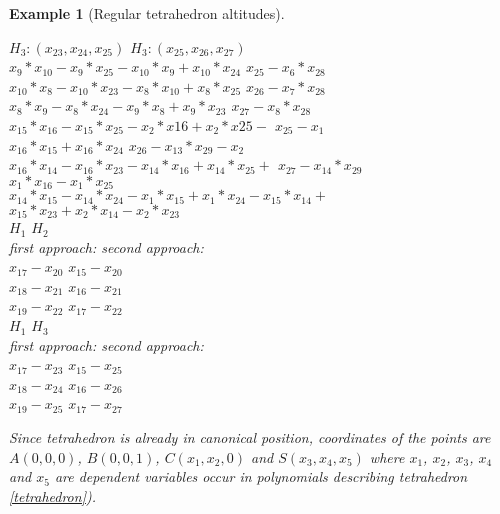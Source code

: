 \documentclass[final,1p,times,authoryear]{elsarticle}
\newtheorem{example}[theorem]{Example}
\begin{document}
\begin{example}[Regular tetrahedron altitudes]
\begin{footnotesize}
\begin{tabbing}
\>\> $H_3 : (x_{23}, x_{24}, x_{25})$  \>\>  $H_3 : (x_{25}, x_{26}, x_{27})$ \\
\>\> $x_9*x_{10}  -  x_9*x_{25}  -  x_{10}*x_9  +  x_{10}*x_{24}$  \>\> $x_{25}  -  x_6*x_{28}$ \\
\>\> $x_{10}*x_8  -  x_{10}*x_{23}  -  x_8*x_{10}  +  x_8*x_{25}$ \>\>  $x_{26}  -  x_7*x_{28}$ \\
\>\> $x_8*x_9  -  x_8*x_{24}  -  x_9*x_8  +  x_9*x_{23}$ \>\>  $x_{27}  -  x_8*x_{28}$ \\
\>\> $x_{15}*x_{16}  -  x_{15}*x_{25}  -  x_2*x{16}  +  x_2*x{25}  -$ \>\>  $x_{25}  -  x_1$ \\
\>\>\> $x_{16}*x_{15}  +  x_{16}*x_{24}$ \>  $x_{26}  -  x_{13}*x_{29}  -  x_2$ \\
\>\> $x_{16}*x_{14}  -  x_{16}*x_{23}  -  x_{14}*x_{16}  +  x_{14}*x_{25}  +$ \>\>  $x_{27}  -  x_{14}*x_{29}$ \\
\>\>\>$x_1*x_{16}  -  x_1*x_{25}$ \\
\>\> $x_{14}*x_{15}  -  x_{14}*x_{24}  -  x_1*x_{15}  +  x_1*x_{24}  -  x_{15}*x_{14}  +$ \\
\>\>\> $x_{15}*x_{23}  +  x_2*x_{14}  -  x_2*x_{23}$ \\
 $H_1$ $H_2$ \\
\>\> first approach: \>\> second approach: \\
\>\> $x_{17}  -  x_{20}$ \>\>  $x_{15}  -  x_{20}$ \\
\>\> $x_{18}  -  x_{21}$ \>\>  $x_{16}  -  x_{21}$ \\
\>\> $x_{19}  -  x_{22}$ \>\>  $x_{17}  -  x_{22}$ \\
 $H_1$ $H_3$ \\
\>\> first approach: \>\> second approach: \\
\>\> $x_{17}  -  x_{23}$ \>\> $x_{15}  -  x_{25}$ \\
\>\> $x_{18}  -  x_{24}$ \>\> $x_{16}  -  x_{26}$ \\
\>\> $x_{19}  -  x_{25}$ \>\> $x_{17}  -  x_{27}$ \\
\end{tabbing}
\end{footnotesize}

Since tetrahedron is already in canonical position, coordinates of the
points are $A(0, 0, 0)$, $B(0, 0, 1)$, $C(x_1, x_2, 0)$ and
$S(x_3, x_4, x_5)$ where $x_1$, $x_2$, $x_3$, $x_4$ and $x_5$ are
dependent variables occur in polynomials describing tetrahedron
\ref{tetrahedron}).


\end{example}
\end{document}
